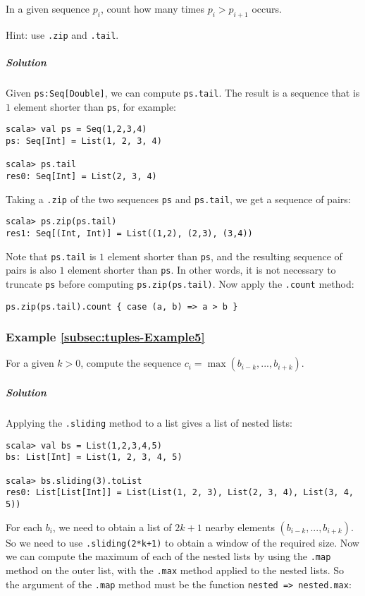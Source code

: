 In a given sequence $p_{i}$, count how many times $p_{i}>p_{i+1}$
occurs.

Hint: use \lstinline!.zip! and \lstinline!.tail!.

\subparagraph{Solution}

Given \lstinline!ps:Seq[Double]!, we can compute \lstinline!ps.tail!.
The result is a sequence that is $1$ element shorter than \lstinline!ps!,
for example:
\begin{lstlisting}
scala> val ps = Seq(1,2,3,4)
ps: Seq[Int] = List(1, 2, 3, 4)

scala> ps.tail
res0: Seq[Int] = List(2, 3, 4)
\end{lstlisting}
Taking a \lstinline!.zip! of the two sequences \lstinline!ps! and
\lstinline!ps.tail!, we get a sequence of pairs:
\begin{lstlisting}
scala> ps.zip(ps.tail)
res1: Seq[(Int, Int)] = List((1,2), (2,3), (3,4))
\end{lstlisting}
Note that \lstinline!ps.tail! is $1$ element shorter than \lstinline!ps!,
and the resulting sequence of pairs is also $1$ element shorter than
\lstinline!ps!. In other words, it is not necessary to truncate \lstinline!ps!
before computing \lstinline!ps.zip(ps.tail)!. Now apply the \lstinline!.count!
method:

\begin{lstlisting}
ps.zip(ps.tail).count { case (a, b) => a > b }
\end{lstlisting}


\subsubsection{Example \label{subsec:tuples-Example5}\ref{subsec:tuples-Example5}}

For a given $k>0$, compute the sequence $c_{i}=\max(b_{i-k},...,b_{i+k})$.

\subparagraph{Solution}

Applying the \lstinline!.sliding! method to a list gives a list of
nested lists:
\begin{lstlisting}
scala> val bs = List(1,2,3,4,5)
bs: List[Int] = List(1, 2, 3, 4, 5)

scala> bs.sliding(3).toList
res0: List[List[Int]] = List(List(1, 2, 3), List(2, 3, 4), List(3, 4, 5)) 
\end{lstlisting}
For each $b_{i}$, we need to obtain a list of $2k+1$ nearby elements
$\left(b_{i-k},...,b_{i+k}\right)$. So we need to use \lstinline!.sliding(2*k+1)!
to obtain a window of the required size. Now we can compute the maximum
of each of the nested lists by using the \lstinline!.map! method
on the outer list, with the \lstinline!.max! method applied to the
nested lists. So the argument of the \lstinline!.map! method must
be the function \lstinline!nested => nested.max!:

